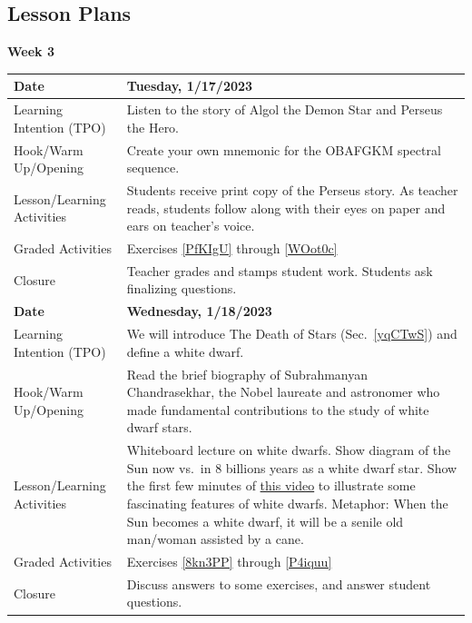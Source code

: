 \documentclass{article}
\numberwithin{equation}{section}
\numberwithin{figure}{section}
\begin{document}
\clearpage
\subsection*{Lesson Plans}


\textbf{Week 3}
\vspace{1ex}

\begin{tabular}{|m{}|m{}|}
    \hline
    \cellcolor{black!20}\textbf{Date} & \cellcolor{black!20}\textbf{Tuesday, 1/17/2023} \\
    \hline
    Learning Intention (TPO) & Listen to the story of Algol the Demon Star and Perseus the Hero.\\
    \hline 
    Hook/Warm Up/Opening & Create your own mnemonic for the OBAFGKM spectral sequence.\\
    \hline
    Lesson/Learning Activities & Students receive print copy of the Perseus story. As teacher reads, students follow along with their eyes on paper and ears on teacher's voice. \\
    \hline
    Graded Activities & Exercises \ref{PfKIgU} through \ref{WOot0c}\\
    \hline
    Closure & Teacher grades and stamps student work. Students ask finalizing questions.\\
    \hline
    \hline

    \cellcolor{black!20}\textbf{Date} & \cellcolor{black!20}\textbf{Wednesday, 1/18/2023} \\
    \hline
    Learning Intention (TPO) & We will introduce The Death of Stars (Sec.~\ref{yqCTwS}) and define a \gls{white dwarf}.\\
    \hline
    Hook/Warm Up/Opening & Read the brief biography of Subrahmanyan Chandrasekhar, the Nobel laureate and astronomer who made fundamental contributions to the study of white dwarf stars.\\
    \hline
    Lesson/Learning Activities & Whiteboard lecture on white dwarfs. Show diagram of the Sun now vs.~in 8 billions years as a white dwarf star. Show the first few minutes of \href{https://youtu.be/Mj06h8BeeOA?t=39}{this video} to illustrate some fascinating features of white dwarfs. Metaphor: When the Sun becomes a white dwarf, it will be a senile old man/woman assisted by a cane. \\
    \hline
    Graded Activities & Exercises \ref{8kn3PP} through \ref{P4iquu}\\
    \hline
    Closure & Discuss answers to some exercises, and answer student questions.\\
    \hline
    \hline


\end{tabular}
\end{document}
